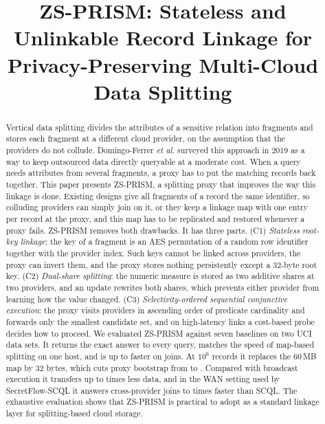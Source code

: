 \documentclass[conference]{IEEEtran}
\newcommand{\sys}{ZS-PRISM}
\begin{document}
\title{ZS-PRISM: Stateless and Unlinkable Record Linkage for Privacy-Preserving Multi-Cloud Data Splitting}

\author{
}

\maketitle

\begin{abstract}
Vertical data splitting divides the attributes of a sensitive relation into fragments and stores each fragment at a different cloud provider, on the assumption that the providers do not collude. Domingo-Ferrer \emph{et al.} surveyed this approach in 2019 as a way to keep outsourced data directly queryable at a moderate cost. When a query needs attributes from several fragments, a proxy has to put the matching records back together. This paper presents \sys{}, a splitting proxy that improves the way this linkage is done. Existing designs give all fragments of a record the same identifier, so colluding providers can simply join on it, or they keep a linkage map with one entry per record at the proxy, and this map has to be replicated and restored whenever a proxy fails. \sys{} removes both drawbacks. It has three parts. (C1) \emph{Stateless root-key linkage}: the key of a fragment is an AES permutation of a random row identifier together with the provider index. Such keys cannot be linked across providers, the proxy can invert them, and the proxy stores nothing persistently except a 32-byte root key. (C2) \emph{Dual-share splitting}: the numeric measure is stored as two additive shares at two providers, and an update rewrites both shares, which prevents either provider from learning how the value changed. (C3) \emph{Selectivity-ordered sequential conjunctive execution}: the proxy visits providers in ascending order of predicate cardinality and forwards only the smallest candidate set, and on high-latency links a cost-based probe decides how to proceed. We evaluated \sys{} against seven baselines on two UCI data sets. It returns the exact answer to every query, matches the speed of map-based splitting on one host, and is up to \LocalFaster{} faster on joins. At $10^6$ records it replaces the 60\,MB map by 32 bytes, which cuts proxy bootstrap from \MapBootMillion{} to \ZSBoot{}. Compared with broadcast execution it transfers up to \PDSaveQfiveNum{} times less data, and in the WAN setting used by SecretFlow-SCQL it answers cross-provider joins \ScqlSpeedupMinNum{} to \ScqlSpeedupMaxNum{} times faster than SCQL. The exhaustive evaluation shows that \sys{} is practical to adopt as a standard linkage layer for splitting-based cloud storage.
\end{abstract}
\end{document}
